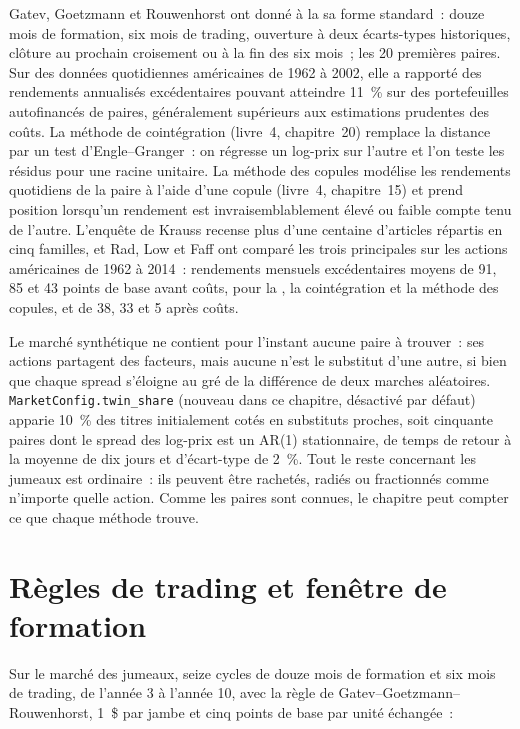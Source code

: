 Gatev, Goetzmann et Rouwenhorst ont donné à la  sa forme standard~: douze mois de formation, six mois de trading, ouverture à deux
écarts-types historiques, clôture au prochain croisement ou à la fin des six mois~; les 20 premières paires. Sur des données quotidiennes américaines de 1962 à 2002, elle a rapporté des rendements annualisés
excédentaires pouvant atteindre 11~\% sur des portefeuilles autofinancés de paires, généralement supérieurs aux estimations prudentes des coûts. La méthode de cointégration (livre~4,
chapitre~20) remplace la distance par un test d'Engle--Granger~: on régresse un log-prix sur l'autre et l'on teste les résidus pour une racine unitaire. La méthode des copules
modélise les rendements quotidiens de la paire à l'aide d'une copule (livre~4, chapitre~15) et prend position lorsqu'un rendement est invraisemblablement élevé ou faible compte tenu de l'autre. L'enquête de Krauss
recense plus d'une centaine d'articles répartis en cinq familles, et Rad, Low et Faff ont comparé les trois principales sur les actions américaines de 1962 à 2014~: rendements mensuels excédentaires moyens
de 91, 85 et 43 points de base avant coûts, pour la , la cointégration et la méthode des copules, et de 38, 33 et 5 après coûts.

Le marché synthétique ne contient pour l'instant aucune paire à trouver~: ses actions partagent des facteurs, mais aucune n'est le substitut d'une autre, si bien que chaque spread s'éloigne au gré de la
différence de deux marches aléatoires. \texttt{MarketConfig.twin\_share} (nouveau dans ce chapitre, désactivé par défaut) apparie 10~\% des titres initialement cotés en substituts
proches, soit cinquante paires dont le spread des log-prix est un AR(1) stationnaire, de temps de retour à la moyenne de dix jours et d'écart-type de 2~\%. Tout le reste
concernant les jumeaux est ordinaire~: ils peuvent être rachetés, radiés ou fractionnés comme n'importe quelle action. Comme les paires sont connues, le chapitre peut compter ce que
chaque méthode trouve.

\section{Règles de trading et fenêtre de formation}

Sur le marché des jumeaux, seize cycles de douze mois de formation et six mois de trading, de l'année 3 à l'année 10, avec la règle de Gatev--Goetzmann--Rouwenhorst,
1~\$ par jambe et cinq points de base par unité échangée~:

